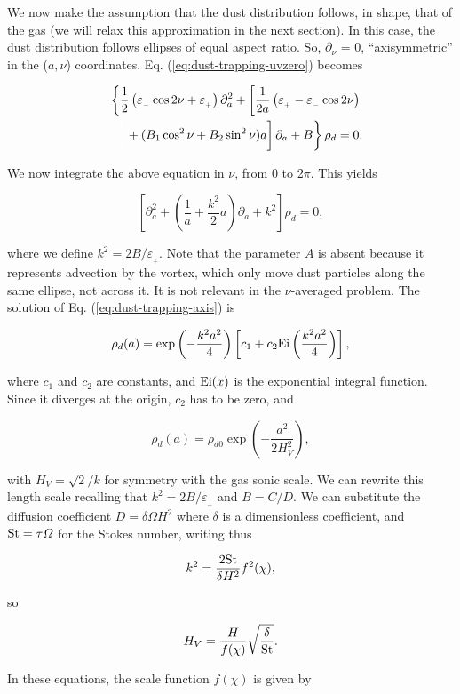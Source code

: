 \documentclass[apj]{emulateapj}
\def\white#1{\textcolor{white}{#1}}
\newcommand{\Eq}[1]{Eq. (\ref{#1})}
\newcommand{\eq}[1]{\Eq{#1}}
\newcommand{\beq}{\begin{equation}}
\newcommand{\eeq}{\end{equation}}
\newcommand{\beqn}{\begin{eqnarray}}
\newcommand{\eeqn}{\end{eqnarray}}
\newcommand{\epsp}{\varepsilon_{_{+}}}
\newcommand{\epsm}{\varepsilon_{_{-}}}
\newcommand{\St}{{\rm St}}
\begin{document}
We now make the assumption that the dust distribution follows, in shape, that of
the gas (we will relax this approximation in the next section). In this case, the
dust distribution follows ellipses of equal aspect ratio. So,
$\partial_\nu$ = 0, ``axisymmetric'' in the ($a,\nu$)
coordinates. \eq{eq:dust-trapping-uvzero} becomes

\beqn
&&\left\{\frac{1}{2}\left(\epsm \cos 2\nu +\epsp\right) \partial^2_a  +  \left[\frac{1}{2a}\left( \epsp - \epsm\cos 2\nu\right) \right.\right. \nonumber\\
&&\left.\left.\white{\frac{1}{1}}+ (B_1\cos^2\nu +  B_2\sin^2\nu)a\right] \partial_a  + B\right\} \rho_d = 0. 
\eeqn

We now integrate the above equation in $\nu$, from 0 to 2$\pi$. This yields

\beq\label{eq:dust-trapping-axis}
\left[\partial^2_a  +  \left(\frac{1}{a} +  \frac{k^2}{2}a\right) \partial_a  + k^2\right]\rho_d = 0, 
\eeq

\noindent where we define $k^2=2B/\epsp$. Note that the parameter $A$
is absent because it represents advection by the vortex, which only
move dust particles along the same ellipse, not across it. It is
not relevant in the $\nu$-averaged problem. The solution of
\eq{eq:dust-trapping-axis} is 

\beq
\rho_d(a) = \exp\left(-\frac{k^2a^2}{4}\right)  \left[c_1 + c_2 {\rm
    Ei}\left(\frac{k^2a^2}{4}\right)\right],
\eeq

\noindent where $c_1$ and $c_2$ are constants, and ${\rm Ei}(x)$ is
the exponential integral function. Since it diverges at the origin, $c_2$ has to be zero, and 

\beq
\rho_d(a) = \rho_{d0} \exp\left(-\frac{a^2}{2H_V^2}\right),
\label{eq:gen_axi}
\eeq

\noindent with $H_V = \sqrt{2}/k$ for symmetry with the gas sonic scale. We can 
rewrite this length scale recalling that $k^2=2B/\epsp$ and
$B=C/D$. We can substitute the diffusion coefficient $D=\delta \varOmega H^2$ where 
$\delta$ is a dimensionless coefficient, and $\St = \tau\varOmega$ for 
the Stokes number, writing thus 

\beqn
\label{eq:k}
k^2 = \frac{2\St}{\delta H^2} f^2(\chi),
\eeqn 

\noindent so

\beq
 H_V = \frac{H}{f(\chi)} \sqrt{\frac{\delta}\St}. 
\label{eq:hv}
\eeq


\noindent In these equations, the scale function $f(\chi)$ is given by 
\end{document}
